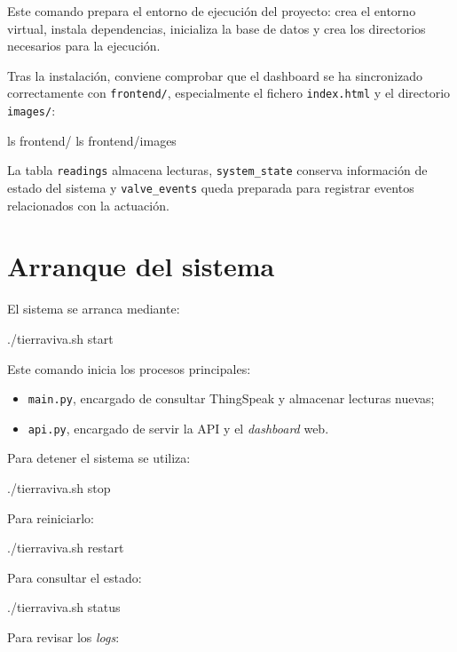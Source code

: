 Este comando prepara el entorno de ejecución del proyecto: crea el entorno virtual, instala dependencias, inicializa la base de datos y crea los directorios necesarios para la ejecución.

Tras la instalación, conviene comprobar que el dashboard se ha sincronizado correctamente con \texttt{frontend/}, especialmente el fichero \texttt{index.html} y el directorio \texttt{images/}:

\begin{bashcode}
ls frontend/
ls frontend/images
\end{bashcode}

La tabla \texttt{readings} almacena lecturas, \texttt{system\_state} conserva información de estado del sistema y \texttt{valve\_events} queda preparada para registrar eventos relacionados con la actuación.

\section{Arranque del sistema}

El sistema se arranca mediante:

\begin{bashcode}
./tierraviva.sh start
\end{bashcode}

Este comando inicia los procesos principales:

\begin{itemize}
    \item \texttt{main.py}, encargado de consultar ThingSpeak y almacenar lecturas nuevas;
    \item \texttt{api.py}, encargado de servir la API y el \textit{dashboard} web.
\end{itemize}

Para detener el sistema se utiliza:

\begin{bashcode}
./tierraviva.sh stop
\end{bashcode}

Para reiniciarlo:

\begin{bashcode}
./tierraviva.sh restart
\end{bashcode}

Para consultar el estado:

\begin{bashcode}
./tierraviva.sh status
\end{bashcode}

Para revisar los \textit{logs}:

